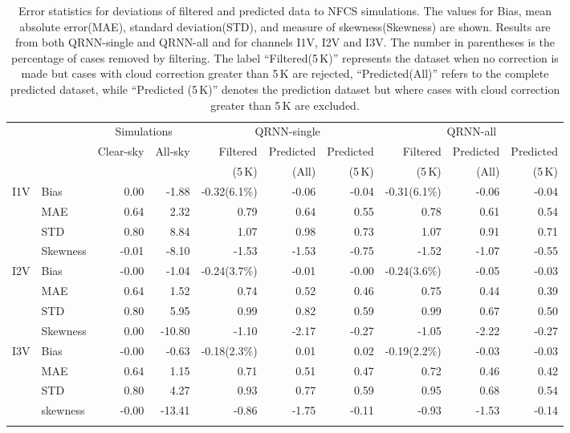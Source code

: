 \documentclass[amt, manuscript]{copernicus}
\begin{document}
\begin{table}[t]
	\caption{ Error statistics for deviations of filtered and predicted data to NFCS simulations. 
		The values for Bias, mean absolute error(MAE), standard deviation(STD), and measure of skewness(Skewness) are shown. Results are from both QRNN-single and QRNN-all and for channels I1V, I2V and I3V. The number in parentheses is the percentage of cases removed by filtering. The label ``Filtered(5\,K)'' represents the dataset when no correction is made but cases with cloud correction greater than 5\,K are rejected, ``Predicted(All)'' refers to the complete predicted dataset, while ``Predicted (5\,K)'' denotes the prediction dataset but where cases with cloud correction greater than 5\,K are excluded.}
	\label{tab:error_statistics_ici}
	\begin{tabular}{llrr|rrr|rrr}
		\tophline
		&&\multicolumn{2}{c|}{Simulations}& \multicolumn{3}{c|}{QRNN-single} & \multicolumn{3}{c}{QRNN-all}\\
		\cline{3-10}
		&&   Clear-sky &   All-sky &  Filtered & Predicted & Predicted &   Filtered & Predicted & Predicted \\
		&&&&							(5\,K) &(All)& (5\,K) & (5\,K)&(All)& (5\,K)\\
		\middlehline
		
		I1V& Bias     &  0.00 & -1.88 & -0.32(6.1\%) & -0.06 & -0.04 & -0.31(6.1\%) & -0.06 & -0.04 \\
		&MAE      &  0.64 &  2.32 &  0.79 &  0.64 &  0.55 &  0.78 &  0.61 &  0.54 \\
		&STD      &  0.80 &  8.84 &  1.07 &  0.98 &  0.73 &  1.07 &  0.91 &  0.71 \\
		&Skewness & -0.01 & -8.10 & -1.53 & -1.53 & -0.75 & -1.52 & -1.07 & -0.55 \\
		\middlehline
		I2V &Bias     & -0.00 &  -1.04 & -0.24(3.7\%) & -0.01 & -0.00 & -0.24(3.6\%) & -0.05 & -0.03 \\
		&MAE      &  0.64 &   1.52 &  0.74 &  0.52 &  0.46 &  0.75 &  0.44 &  0.39 \\
		&STD      &  0.80 &   5.95 &  0.99 &  0.82 &  0.59 &  0.99 &  0.67 &  0.50 \\
		&Skewness &  0.00 & -10.80 & -1.10 & -2.17 & -0.27 & -1.05 & -2.22 & -0.27 \\
		\middlehline	
		I3V &Bias     & -0.00 &  -0.63 & -0.18(2.3\%) &  0.01 &  0.02 & -0.19(2.2\%) & -0.03 & -0.03 \\
		&MAE      &  0.64 &   1.15 &  0.71 &  0.51 &  0.47 &  0.72 &  0.46 &  0.42 \\
		&STD      &  0.80 &   4.27 &  0.93 &  0.77 &  0.59 &  0.95 &  0.68 &  0.54 \\
		&skewness & -0.00 & -13.41 & -0.86 & -1.75 & -0.11 & -0.93 & -1.53 & -0.14 \\
		\bottomhline
	\end{tabular}
	\belowtable{} %
\end{table}
\end{document}
